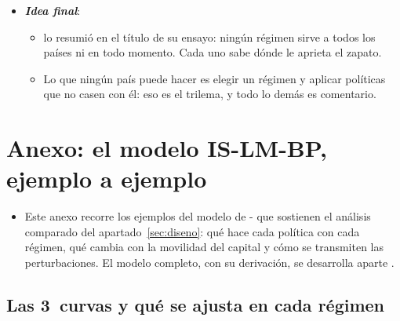 \documentclass[11pt]{article}
\begin{document}
\begin{itemize}
\begin{itemize}
  \item La paradoja de los últimos 20~años: mientras los tipos fijos perdían peso, el consenso aceptaba la intervención y los controles como complemento de la flotación\nocite{FMI2020IPF,FMI2022RevisionVI}.
  \item No es una vuelta atrás, sino reconocer que el trilema tiene las esquinas redondeadas.
  \end{itemize}
\item \textbf{\emph{Idea final}}:
  \begin{itemize}
  \item \textcite{Frankel1999NoSingle} lo resumió en el título de su ensayo: ningún régimen sirve a todos los países ni en todo momento. Cada uno sabe dónde le aprieta el zapato.
  \item Lo que ningún país puede hacer es elegir un régimen y aplicar políticas que no casen con él: eso es el trilema, y todo lo demás es comentario.
  \end{itemize}
\end{itemize}

\clearpage
\appendix

\section{Anexo: el modelo IS-LM-BP, ejemplo a ejemplo}\label{anexo:is-lm-bp}

\begin{itemize}
\item Este anexo recorre los ejemplos del modelo de - que sostienen el análisis comparado del apartado~\ref{sec:diseno}: qué hace cada política con cada régimen, qué cambia con la movilidad del capital y cómo se transmiten las perturbaciones. El modelo completo, con su derivación, se desarrolla aparte\nocite{Fleming1962Domestic,Mundell1963Capital,Gandolfo2002International} .
\end{itemize}

\subsection{Las 3~curvas y qué se ajusta en cada régimen}\label{anexo:is-lm-bp-curvas}
\end{document}
